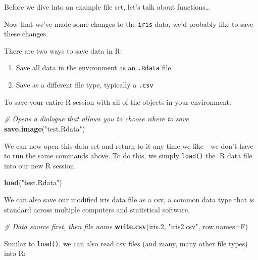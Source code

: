 \documentclass[]{article}
\newenvironment{Shaded}{\begin{snugshade}}{\end{snugshade}}
\newcommand{\KeywordTok}[1]{\textcolor[rgb]{0.13,0.29,0.53}{\textbf{#1}}}
\newcommand{\DataTypeTok}[1]{\textcolor[rgb]{0.13,0.29,0.53}{#1}}
\newcommand{\DecValTok}[1]{\textcolor[rgb]{0.00,0.00,0.81}{#1}}
\newcommand{\StringTok}[1]{\textcolor[rgb]{0.31,0.60,0.02}{#1}}
\newcommand{\CommentTok}[1]{\textcolor[rgb]{0.56,0.35,0.01}{\textit{#1}}}
\newcommand{\NormalTok}[1]{#1}
\providecommand{\tightlist}{%
  \setlength{\itemsep}{0pt}\setlength{\parskip}{0pt}}
\begin{document}
Before we dive into an example file set, let's talk about
functions\ldots{}

Now that we've made some changes to the \texttt{iris} data, we'd
probably like to save these changes.

There are two ways to save data in R:

\begin{enumerate}
\def\labelenumi{\arabic{enumi}.}
\tightlist
\item
  Save all data in the environment as an \texttt{.Rdata} file
\item
  Save as a different file type, typically a \texttt{.csv}
\end{enumerate}

To save your entire R session with all of the objects in your
environment:

\begin{Shaded}
\begin{Highlighting}[]
\CommentTok{# Opens a dialogue that allows you to choose where to save}
\KeywordTok{save.image}\NormalTok{(}\StringTok{"test.Rdata"}\NormalTok{)}
\end{Highlighting}
\end{Shaded}

We can now open this data-set and return to it any time we like - we
don't have to run the same commands above. To do this, we simply
\texttt{load()} the .R data file into our new R session.

\begin{Shaded}
\begin{Highlighting}[]
\KeywordTok{load}\NormalTok{(}\StringTok{"test.Rdata"}\NormalTok{)}
\end{Highlighting}
\end{Shaded}

We can also save our modified iris data file as a csv, a common data
type that is standard across multiple computers and statistical
software.

\begin{Shaded}
\begin{Highlighting}[]
\CommentTok{# Data source first, then file name}
\KeywordTok{write.csv}\NormalTok{(iris.}\DecValTok{2}\NormalTok{, }\StringTok{"iris2.csv"}\NormalTok{, }\DataTypeTok{row.names=}\NormalTok{F)}
\end{Highlighting}
\end{Shaded}

Similar to \texttt{load()}, we can also read csv files (and many, many
other file types) into R:
\end{document}
